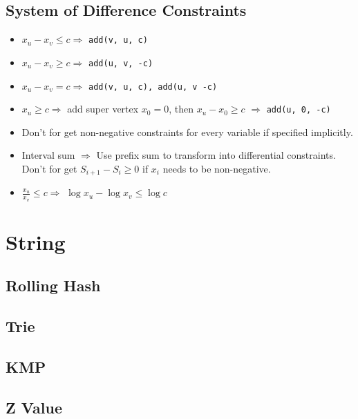 \documentclass[a4paper,10pt,twocolumn,oneside]{article}
\begin{document}
\subsection{System of Difference Constraints}

\begin{itemize}
	\item $x_u - x_v \le c \Rightarrow$ \texttt{add(v, u, c)}
	\item $x_u - x_v \ge c \Rightarrow$ \texttt{add(u, v, -c)}
	\item $x_u - x_v = c \Rightarrow$ \texttt{add(v, u, c), add(u, v -c)}
	\item $x_u \ge c \Rightarrow$ add super vertex $x_0 = 0$, then $x_u - x_0 \ge c$ $\Rightarrow$ \texttt{add(u, 0, -c)}
	\item Don't for get non-negative constraints for every variable if specified implicitly.
	\item Interval sum $\Rightarrow$ Use prefix sum to transform into differential constraints.  Don't for get $S_{i+1} - S_{i} \ge 0$ if $x_i$ needs to be non-negative.
	\item $\frac{x_u}{x_v} \le c \Rightarrow$ $\log{x_u} - \log{x_v} \le \log{c}$
\end{itemize}





\section{String}

\subsection{Rolling Hash}


\subsection{Trie}


\subsection{KMP}


\subsection{Z Value}

\end{document}
